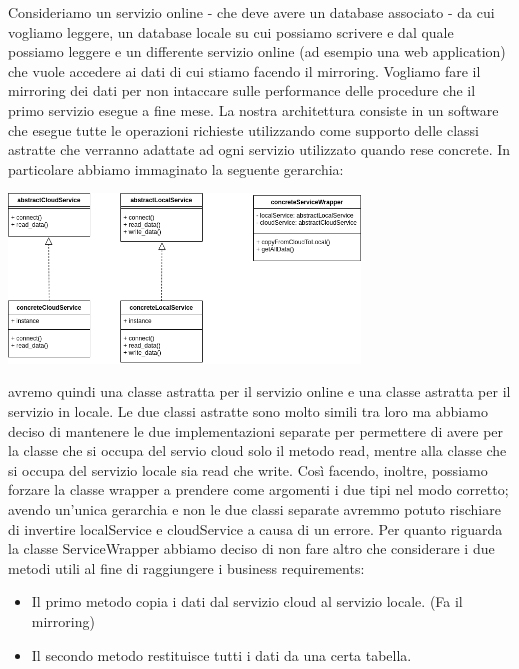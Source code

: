 \documentclass[a4paper]{article}
\begin{document}
Consideriamo un servizio online - che deve avere un database associato - da cui vogliamo leggere, un database 
locale su cui possiamo scrivere e dal quale possiamo leggere e un differente servizio online (ad esempio una web application) che vuole accedere ai 
dati di cui stiamo facendo il mirroring. Vogliamo fare il mirroring dei dati per non intaccare
sulle performance delle procedure che il primo servizio esegue a fine mese. La nostra architettura consiste in un software che esegue
tutte le operazioni richieste utilizzando come supporto delle classi astratte che verranno adattate ad ogni
servizio utilizzato quando rese concrete. In particolare abbiamo immaginato la seguente gerarchia:

\begin{center}
    \includegraphics[width=0.7\textwidth]{imgs/gerarchiaAstratta.png}
\end{center}

avremo quindi una classe astratta per il servizio online e una classe astratta per il servizio in locale. Le due 
classi astratte sono molto simili tra loro ma abbiamo deciso di mantenere le due implementazioni 
separate per permettere di avere per la 
classe che si occupa del servio cloud solo il metodo read, mentre alla classe che si occupa del servizio locale 
sia read che write. Così facendo, inoltre, possiamo forzare la classe wrapper a prendere come
argomenti i due tipi nel modo corretto; avendo un'unica gerarchia e non le due classi separate 
avremmo potuto rischiare di invertire localService e cloudService a causa di un errore.
Per quanto riguarda la classe ServiceWrapper abbiamo deciso di non fare altro che considerare 
i due metodi utili al fine di raggiungere i business requirements:
\begin{itemize}
    \item Il primo metodo copia i dati dal servizio cloud al servizio locale. (Fa il mirroring)
    \item Il secondo metodo restituisce tutti i dati da una certa tabella.
\end{itemize}
\end{document}
